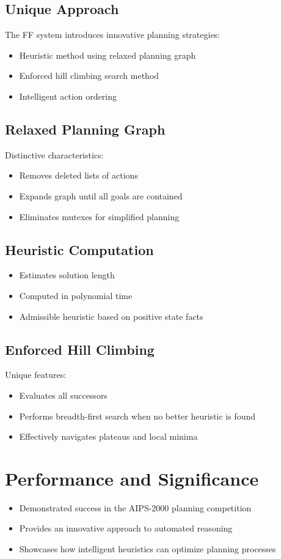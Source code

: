 \documentclass[12pt]{article}
\begin{document}
\subsection{Unique Approach}
The FF system introduces innovative planning strategies:
\begin{itemize}
    \item Heuristic method using relaxed planning graph
    \item Enforced hill climbing search method
    \item Intelligent action ordering
\end{itemize}

\subsection{Relaxed Planning Graph}
Distinctive characteristics:
\begin{itemize}
    \item Removes deleted lists of actions
    \item Expands graph until all goals are contained
    \item Eliminates mutexes for simplified planning
\end{itemize}

\subsection{Heuristic Computation}
\begin{itemize}
    \item Estimates solution length
    \item Computed in polynomial time
    \item Admissible heuristic based on positive state facts
\end{itemize}

\subsection{Enforced Hill Climbing}
Unique features:
\begin{itemize}
    \item Evaluates all successors
    \item Performs breadth-first search when no better heuristic is found
    \item Effectively navigates plateaus and local minima
\end{itemize}

\section{Performance and Significance}
\begin{itemize}
    \item Demonstrated success in the AIPS-2000 planning competition
    \item Provides an innovative approach to automated reasoning
    \item Showcases how intelligent heuristics can optimize planning processes
\end{itemize}
\end{document}
